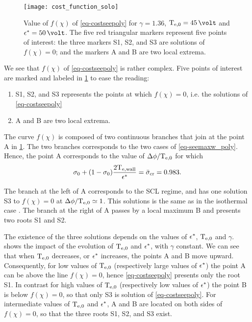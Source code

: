\begin{figure}[!hbt]
  \centering
  \texttt{[image: cost\_function\_solo]}
  \caption{Value of $f(\chi)$ of \cref{eq-costseepoly} for $\gamma = 1.36$, $\Teb=45\,\volt$ and $\crover=50\,\volt$. The five red triangular markers represent five points of interest\string: the three markers S1, S2, and S3 are solutions of $f(\chi) = 0$; and the markers A and B are two local extrema. }
  \label{fig-costfunction}
\end{figure}

We see that $f(\chi)$ of \cref{eq-costseepoly} is rather complex.
Five points of interest are marked and labeled in \cref{fig-costfunction} to ease the reading\string: 
\begin{enumerate}
  \item S1, S2, and S3 represents the points at which $f(\chi)=0$, i.e. the solutions of  \cref{eq-costseepoly}
  \item A and B are two local extrema.
\end{enumerate}

The curve $f(\chi)$ is composed of two continuous branches that join at the point A in \cref{fig-costfunction}.
The two branches corresponds to the two cases of \cref{eq-seemaxw_poly}. Hence, the point A corresponds to the value of $\Delta \phi/\mathrm{T_{e, 0}}$ for which  \[ \sigma_0 + ( 1 - \sigma_0) \frac{ 2 \mathrm{T_{e, wall}}  }{\epsilon^{*}} =  \bar{\sigma }_{\rm cr} = 0.983. \]

The branch at the left of A corresponds to the \ac{SCL} regime, and has one solution S3 to $f(\chi)=0$ at $\Delta \phi / \mathrm{T_{e, 0}} \simeq 1$.
This solutions is the same as in the isothermal case \citep{hobbs1967}.
The branch at the right of A passes by a local maximum B and presents two roots S1 and S2.

The existence of the three solutions depends on the values of $\epsilon^{*}$, $\mathrm{T_{e, 0}}$ and $\gamma$.
 shows the impact of the evolution of $\mathrm{T_{e, 0}}$ and $\epsilon^{*}$, with $\gamma$ constant.
We can see that when $\mathrm{T_{e, 0}}$ decreases, or $\epsilon^{*}$ increases, the points A and B move upward.
Consequently, for low values of $\mathrm{T_{e, 0}}$ (respectively large values of $\epsilon^{*}$) the point A can be above the line $f(\chi) = 0$, hence  \cref{eq-costseepoly} presents only the root S1.
In contrast for high values of $\mathrm{T_{e, 0}}$ (respectively low values of $\epsilon^{*}$) the point B is below $f(\chi) = 0$, so that only S3 is solution of  \cref{eq-costseepoly}.
For intermediate values of $\mathrm{T_{e, 0}}$ and $\epsilon^{*}$, A and B are located on both sides of $f(\chi) = 0$, so that the three roots S1, S2, and S3 exist.
\renewcommand\subfigurewidth{0.47\textwidth}

